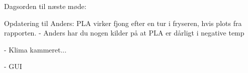 Dagsorden til næste møde:

Opdatering til Anders: PLA virker fjong efter en tur i fryseren, hvis plots fra rapporten.
- Anders har du nogen kilder på at PLA er dårligt i negative temp

- Klima kammeret...

- GUI


